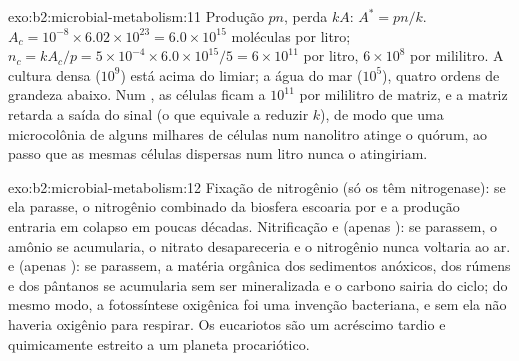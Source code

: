 \begin{solution}{exo:b2:microbial-metabolism:11}
Produção $pn$, perda $kA$: $A^* = pn/k$. $A_c = 10^{-8}\times
6.02\times 10^{23} = 6.0\times 10^{15}$ moléculas por litro; $n_c =
kA_c/p = 5\times 10^{-4}\times 6.0\times 10^{15}/5 = 6\times 10^{11}$
por litro, $6\times 10^{8}$ por mililitro. A cultura densa
($10^{9}$) está acima do limiar; a água do mar ($10^{5}$), quatro
ordens de grandeza abaixo. Num , as células ficam a $10^{11}$
por mililitro de matriz, e a matriz retarda a saída do sinal
(o que equivale a reduzir $k$), de modo que uma microcolônia de alguns
milhares de células num nanolitro atinge o quórum, ao passo que as
mesmas células dispersas num litro nunca o atingiriam.
\end{solution}

\begin{solution}{exo:b2:microbial-metabolism:12}
Fixação de nitrogênio (só os  têm nitrogenase): se ela
parasse, o nitrogênio combinado da biosfera escoaria por
 e a produção entraria em colapso em poucas décadas.
Nitrificação e  (apenas ): se parassem, o
amônio se acumularia, o nitrato desapareceria e o nitrogênio nunca
voltaria ao ar.  e  (apenas
): se parassem, a matéria orgânica dos sedimentos
anóxicos, dos rúmens e dos pântanos se acumularia sem ser
mineralizada e o carbono sairia do ciclo; do mesmo modo, a fotossíntese
oxigênica foi uma invenção bacteriana, e sem ela não haveria oxigênio
para respirar. Os eucariotos são um acréscimo tardio e quimicamente
estreito a um planeta procariótico.
\end{solution}


